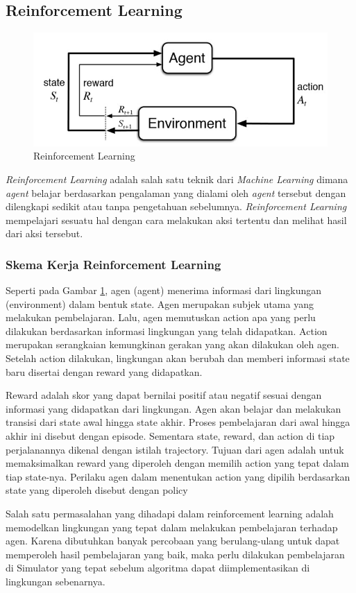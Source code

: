 \subsection{Reinforcement Learning}
\begin{figure}[H] 
	\centering
	\includegraphics[width=.4\linewidth]{images/reinforcement_learning}
	\caption{Reinforcement Learning}
	\label{fig:reinforcement_learning}
\end{figure}
\textit{Reinforcement Learning }adalah salah satu teknik dari \textit{Machine Learning }dimana \textit{agent }belajar berdasarkan pengalaman yang dialami oleh \textit{agent }tersebut dengan dilengkapi sedikit atau tanpa pengetahuan sebelumnya. \textit{Reinforcement Learning }mempelajari sesuatu hal dengan cara melakukan aksi tertentu dan melihat hasil dari aksi tersebut.\cite{cit:rl_book}

\subsubsection{Skema Kerja Reinforcement Learning}
Seperti pada Gambar \ref{fig:reinforcement_learning}, agen (agent) menerima informasi dari lingkungan (environment) dalam bentuk state. Agen merupakan subjek utama yang melakukan pembelajaran. Lalu, agen memutuskan action apa yang perlu dilakukan berdasarkan informasi lingkungan yang telah didapatkan. Action merupakan serangkaian kemungkinan gerakan yang akan dilakukan oleh agen. Setelah action dilakukan, lingkungan akan berubah dan memberi informasi state baru disertai dengan reward yang didapatkan.

Reward adalah skor yang dapat bernilai positif atau negatif sesuai dengan informasi yang didapatkan dari lingkungan. Agen akan belajar dan melakukan transisi dari state awal hingga state akhir. Proses pembelajaran dari awal hingga akhir ini disebut dengan episode. Sementara state, reward, dan action di tiap perjalanannya dikenal dengan istilah trajectory. Tujuan dari agen adalah untuk memaksimalkan reward yang diperoleh dengan memilih action yang tepat dalam tiap state-nya. Perilaku agen dalam menentukan action yang dipilih berdasarkan state yang diperoleh disebut dengan policy

Salah satu permasalahan yang dihadapi dalam reinforcement learning adalah memodelkan lingkungan yang tepat dalam melakukan pembelajaran terhadap agen. Karena dibutuhkan banyak percobaan yang berulang-ulang untuk dapat memperoleh hasil pembelajaran yang baik, maka perlu dilakukan pembelajaran di Simulator yang tepat sebelum algoritma dapat diimplementasikan di lingkungan sebenarnya.
\iffalse

